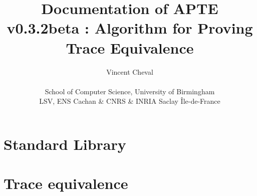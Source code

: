 \documentclass[a4paper,10pt]{book}
\title{Documentation of APTE v0.3.2beta : Algorithm for Proving Trace Equivalence}
\author{Vincent Cheval
\\
\\
School of Computer Science, University of Birmingham\\
LSV, ENS Cachan \& CNRS \& INRIA Saclay \^Ile-de-France}
\begin{document}
\maketitle

\tableofcontents

\chapter{Standard Library}


\chapter{Trace equivalence}




\end{document}
